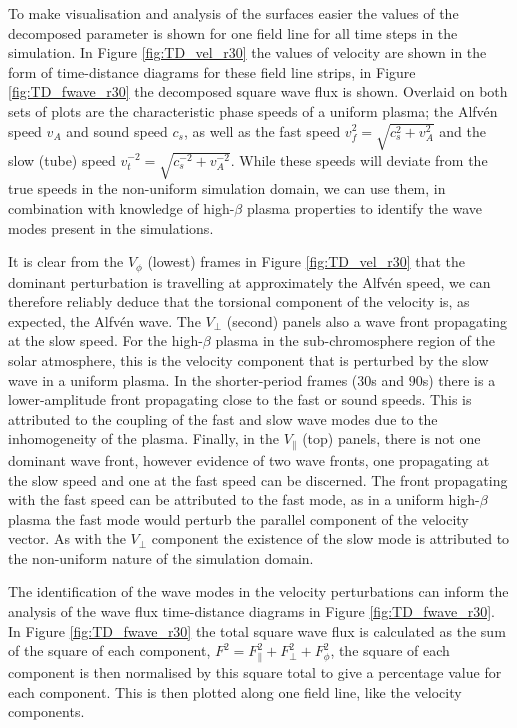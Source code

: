 To make visualisation and analysis of the surfaces easier the values of the decomposed parameter is shown for one field line for all time steps in the simulation.
In Figure \ref{fig:TD_vel_r30} the values of velocity are shown in the form of time-distance diagrams for these field line strips, in Figure \ref{fig:TD_fwave_r30} the decomposed square wave flux is shown. Overlaid on both sets of plots are the characteristic phase speeds of a uniform plasma; the Alfv\'en speed $v_A$ and sound speed $c_s$, as well as the fast speed $v_f^2 = \sqrt{c_s^2 + v_A^2}$ and the slow (tube) speed $v_t^{-2} = \sqrt{c_s^{-2} + v_A^{-2}}$.
While these speeds will deviate from the true speeds in the non-uniform simulation domain, we can use them, in combination with knowledge of high-$\beta$ plasma properties to identify the wave modes present in the simulations.


It is clear from the $V_\phi$ (lowest) frames in Figure \ref{fig:TD_vel_r30} that the dominant perturbation is travelling at approximately the Alfv\'en speed, we can therefore reliably deduce that the torsional component of the velocity is, as expected, the Alfv\'en wave.
The $V_\perp$ (second) panels also a wave front propagating at the slow speed. For the high-$\beta$ plasma in the sub-chromosphere region of the solar atmosphere, this is the velocity component that is perturbed by the slow wave in a uniform plasma. In the shorter-period frames ($30$s and $90$s) there is a lower-amplitude front propagating close to the fast or sound speeds.
This is attributed to the coupling of the fast and slow wave modes due to the inhomogeneity of the plasma.
Finally, in the $V_\parallel$ (top) panels, there is not one dominant wave front, however evidence of two wave fronts, one propagating at the slow speed and one at the fast speed can be discerned.
The front propagating with the fast speed can be attributed to the fast mode, as in a uniform high-$\beta$ plasma the fast mode would perturb the parallel component of the velocity vector.
As with the $V_\perp$ component the existence of the slow mode is attributed to the non-uniform nature of the simulation domain.


The identification of the wave modes in the velocity perturbations can inform the analysis of the wave flux time-distance diagrams in Figure \ref{fig:TD_fwave_r30}.
In Figure \ref{fig:TD_fwave_r30} the total square wave flux is calculated as the sum of the square of each component, $ F^2 = F_\parallel^2 + F_\perp ^2  + F_\phi^2$, the square of each component is then normalised by this square total to give a percentage value for each component.
This is then plotted along one field line, like the velocity components.


